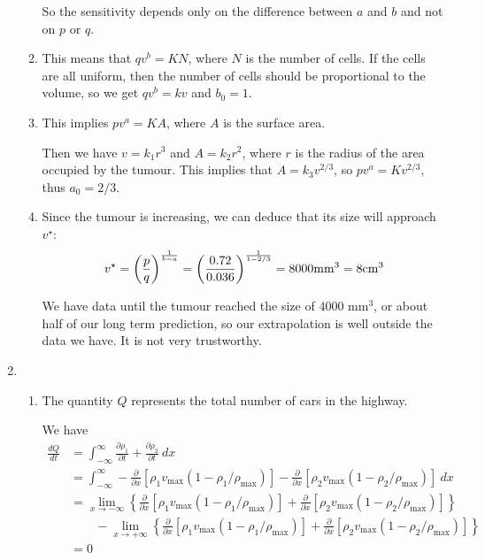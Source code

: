 \begin{enumerate}
\begin{enumerate}
	So the sensitivity depends only on the difference between $a$ and $b$ and not on $p$ or $q$.
	
	
	\item This means that $qv^b = K N$, where $N$ is the number of cells. If the cells are all uniform, then the number of cells should be proportional to the volume, so we get $qv^b = k v$ and $b_0=1$.
	
	\item This implies $pv^a = K A$, where $A$ is the surface area.
	
	Then we have $v = k_1 r^3$ and $A = k_2 r^2$, where $r$ is the radius of the area occupied by the tumour. This implies that $ A = k_3  v^{2/3}$, so $pv^a = K v^{2/3}$, thus $a_0 = 2/3$.
	
	\item Since the tumour is increasing, we can deduce that its size will approach $v^\star$:
	\[
	v^\star 
		= \left(\frac{p}{q}\right)^{\frac{1}{b-a}} 
		= \left(\frac{0.72}{0.036}\right)^{\frac{1}{1-2/3}}
		= 8000 {\rm mm}^3 = 8 {\rm cm}^3
	\]
	
	We have data until the tumour reached the size of 4000 mm$^3$, or about half of our long term prediction, so our extrapolation is well outside the data we have. It is not very trustworthy.

	\end{enumerate}
	
	
	
	
\item 
\begin{enumerate}
	\item The quantity $Q$ represents the total number of cars in the highway.
	
	We have
	\begin{align*}
		\frac{d Q}{dt}
			& = \int_{-\infty}^{\infty} \frac{\partial \rho_1}{\partial t} + \frac{\partial \rho_2}{\partial t} ~dx \\
			& = \int_{-\infty}^{\infty} - \frac{\partial}{\partial x} \left[ \rho_1 v_{\max}(1-\rho_1/\rho_{\max})\right] - \frac{\partial}{\partial x} \left[ \rho_2 v_{\max}(1-\rho_2/\rho_{\max})\right] ~dx\\
			& = \lim_{x \to -\infty} \left\{ \frac{\partial}{\partial x} \left[ \rho_1 v_{\max}(1-\rho_1/\rho_{\max})\right] + \frac{\partial}{\partial x} \left[ \rho_2 v_{\max}(1-\rho_2/\rho_{\max})\right] \right\} \\
			& 	\qquad - \lim_{x \to +\infty} \left\{ \frac{\partial}{\partial x} \left[ \rho_1 v_{\max}(1-\rho_1/\rho_{\max})\right] + \frac{\partial}{\partial x} \left[ \rho_2 v_{\max}(1-\rho_2/\rho_{\max})\right] \right\} \\
			& = 0
	\end{align*}


\end{enumerate}
\end{enumerate}

